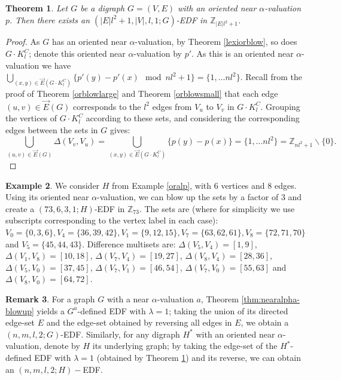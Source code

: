 \documentclass[12pt, a4paper]{article}
\newtheorem{theorem}{Theorem}[section]
\theoremstyle{definition}
\newtheorem{example}[theorem]{Example}
\newtheorem{remark}[theorem]{Remark}
\begin{document}
\begin{theorem}\label{thm:EDFfromorblowup}
Let $G$ be a digraph $G=(V,E)$ with an oriented near $\alpha$-valuation $p$.  Then there exists an $(|E|l^2 + 1, |V|, l, 1; G)$-EDF in $\mathbb{Z}_{|E|l^2+1}$.
\end{theorem}
\begin{proof}
    As $G$ has an oriented near $\alpha$-valuation, by Theorem \ref{lexiorblow}, so does $G \cdot K_{l}^C$; denote this oriented near $\alpha$-valuation by $p'$.  As this is an oriented near $\alpha$-valuation we have $\bigcup_{(x,y)\in \overrightarrow{E}(G \cdot K_{l}^C)} \{p'(y)-p'(x) \mod nl^2+1\} =\{1, \ldots nl^2\}$. Recall from the proof of Theorem \ref{orblowlarge} and Theorem \ref{orblowsmall} that each edge $(u,v) \in \overrightarrow{E}(G)$ corresponds to the $l^2$ edges from $V_u$ to $V_v$ in $G \cdot K_{l}^C$. Grouping the vertices of $G \cdot K_{l}^C$ according to these sets, and considering the corresponding edges between the sets in $G$ gives:
    \[\bigcup_{(u,v)\in \overrightarrow{E}(G)} \Delta(V_v,V_u ) = \bigcup_{(x,y)\in \overrightarrow{E}(G \cdot K_{l}^C)} \{p(y)-p(x)\}=\{1, \ldots nl^2\}=\mathbb{Z}_{nl^2+1}\backslash\{0\}.\]
\end{proof}

\begin{example}
We consider $H$ from Example \ref{oralp}, with $6$ vertices and $8$ edges. Using its oriented near $\alpha$-valuation, we can blow up the sets by a factor of $3$ and create a $(73, 6, 3, 1; H)$-EDF in $\mathbb{Z}_{73}$. The sets are (where for simplicity we use subscripts corresponding to the vertex label in each case): $V_0=\{0,3,6\}, V_{4} = \{36,39,42\}, V_{1} = \{9,12,15\},V_7 = \{63,62,61\}, V_8 = \{72,71,70\}$ and $V_5 = \{ 45,44,43\}$. Difference multisets are: $\Delta(V_5,V_4)=[1,9]$, $\Delta(V_1,V_8)=[10,18]$, $\Delta(V_7,V_4)=[19,27]$, $\Delta(V_8,V_4)=[28,36]$, $\Delta(V_5,V_0)=[37,45]$, $\Delta(V_7,V_1)=[46,54]$, $\Delta(V_7,V_0)=[55,63]$ and $\Delta(V_8,V_0)=[64,72]$.
\end{example}


\begin{remark}
For a graph $G$ with a near $\alpha$-valuation $a$, Theorem \ref{thm:nearalpha-blowup} yields a $G^a$-defined EDF with $\lambda=1$; taking the union of its directed edge-set $E$ and the edge-set obtained by reversing all edges in $E$, we obtain a $(n,m,l,2;G)$-EDF.  Similarly, for any digraph $H^*$ with an oriented near $\alpha$-valuation, denote by $H$ its underlying graph; by taking the edge-set of the $H^*$-defined EDF with $\lambda=1$ (obtained by Theorem \ref{thm:EDFfromorblowup}) and its reverse, we can obtain an $(n,m,l,2;H)-$EDF.
\end{remark}
\end{document}

